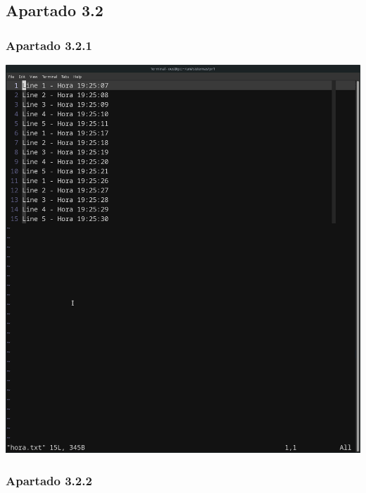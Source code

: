\documentclass[spanish]{article}
\begin{document}
\newpage

\subsection{Apartado 3.2}

\subsubsection{Apartado 3.2.1}

\begin{center}
\includegraphics[scale=.25]{../img/13.png}
\end{center}

\newpage

\subsubsection{Apartado 3.2.2}
\end{document}
